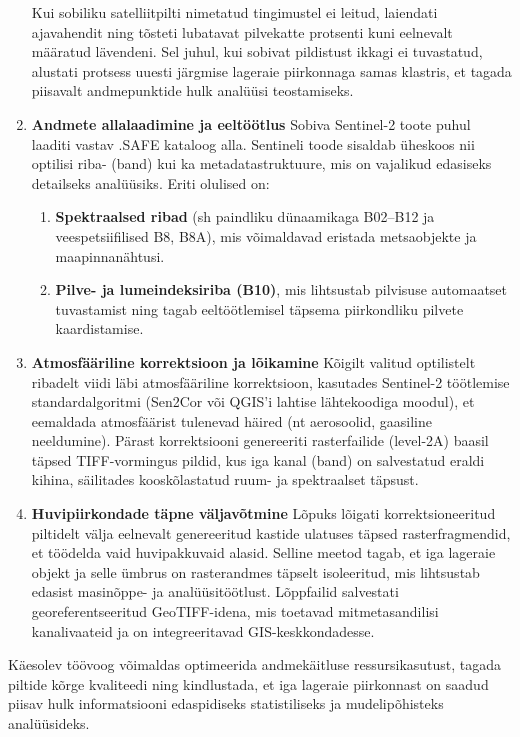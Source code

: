 \begin{enumerate}[topsep=1pt,itemsep=1ex,partopsep=1ex,parsep=1ex]
Kui sobiliku satelliitpilti nimetatud tingimustel ei leitud,
laiendati ajavahendit ning tõsteti lubatavat pilvekatte protsenti kuni eelnevalt
määratud lävendeni. Sel juhul, kui sobivat pildistust ikkagi ei tuvastatud,
alustati protsess uuesti järgmise lageraie piirkonnaga samas klastris, et tagada
piisavalt andmepunktide hulk analüüsi teostamiseks.

\item \textbf{Andmete allalaadimine ja eeltöötlus} \newline
 Sobiva Sentinel-2 toote puhul laaditi
vastav .SAFE kataloog alla. Sentineli toode sisaldab üheskoos nii optilisi riba-
(band) kui ka metadatastruktuure, mis on vajalikud edasiseks detailseks
analüüsiks. Eriti olulised on:

\begin{enumerate}
\item \textbf{Spektraalsed ribad} (sh paindliku dünaamikaga B02--B12 ja veespetsiifilised B8,
B8A), mis võimaldavad eristada metsaobjekte ja maapinnanähtusi.

\item \textbf{Pilve- ja lumeindeksiriba (B10)}, mis lihtsustab pilvisuse automaatset
tuvastamist ning tagab eeltöötlemisel täpsema piirkondliku pilvete kaardistamise.
\end{enumerate}

\item \textbf{Atmosfääriline korrektsioon ja lõikamine} \newline
Kõigilt valitud optilistelt ribadelt
viidi läbi atmosfääriline korrektsioon, kasutades Sentinel-2 töötlemise
standardalgoritmi (Sen2Cor või QGIS'i lahtise lähtekoodiga moodul), et eemaldada
atmosfäärist tulenevad häired (nt aerosoolid, gaasiline neeldumine). Pärast
korrektsiooni genereeriti rasterfailide (level-2A) baasil täpsed TIFF-vormingus
pildid, kus iga kanal (band) on salvestatud eraldi kihina, säilitades
kooskõlastatud ruum- ja spektraalset täpsust.

\item \textbf{Huvipiirkondade täpne väljavõtmine} \newline
Lõpuks lõigati korrektsioneeritud
piltidelt välja eelnevalt genereeritud kastide ulatuses täpsed rasterfragmendid,
et töödelda vaid huvipakkuvaid alasid. Selline meetod tagab, et iga lageraie
objekt ja selle ümbrus on rasterandmes täpselt isoleeritud, mis lihtsustab
edasist masinõppe- ja analüüsitöötlust. Lõppfailid salvestati
georeferentseeritud GeoTIFF-idena, mis toetavad mitmetasandilisi kanalivaateid
ja on integreeritavad GIS-keskkondadesse.

\end{enumerate}
Käesolev töövoog võimaldas optimeerida andmekäitluse ressursikasutust, tagada
piltide kõrge kvaliteedi ning kindlustada, et iga lageraie piirkonnast on saadud
piisav hulk informatsiooni edaspidiseks statistiliseks ja mudelipõhisteks
analüüsideks.


